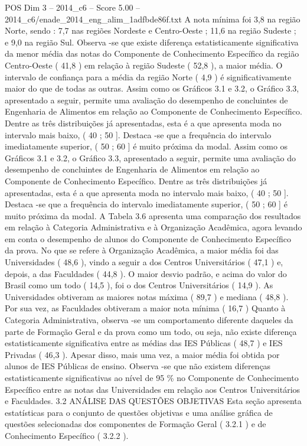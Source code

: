 \begin{textsample}{POS Dim 3 – 2014\_c6 – Score 5.00 – 2014\_c6/enade\_2014\_eng\_alim\_1adfbde86f.txt}
A nota mínima foi 3,8 na região Norte, sendo : 7,7 nas regiões Nordeste e Centro-Oeste ; 11,6 na região Sudeste ; e 9,0 na região Sul.
Observa -se que existe diferença estatisticamente significativa da menor média das notas do Componente de Conhecimento Específico da região Centro-Oeste ( 41,8 ) em relação à região Sudeste ( 52,8 ), a maior média.
O intervalo de confiança para a média da região Norte ( 4,9 ) é significativamente maior do que de todas as outras.
Assim como os Gráficos 3.1 e 3.2, o Gráfico 3.3, apresentado a seguir, permite uma avaliação do desempenho de concluintes de Engenharia de Alimentos em relação ao Componente de Conhecimento Específico.
Dentre as três distribuições já apresentadas, esta é a que apresenta moda no intervalo mais baixo, ( 40 ; 50 ].
Destaca -se que a frequência do intervalo imediatamente superior, ( 50 ; 60 ] é muito próxima da modal.
Assim como os Gráficos 3.1 e 3.2, o Gráfico 3.3, apresentado a seguir, permite uma avaliação do desempenho de concluintes de Engenharia de Alimentos em relação ao Componente de Conhecimento Específico.
Dentre as três distribuições já apresentadas, esta é a que apresenta moda no intervalo mais baixo, ( 40 ; 50 ].
Destaca -se que a frequência do intervalo imediatamente superior, ( 50 ; 60 ] é muito próxima da modal.
A Tabela 3.6 apresenta uma comparação dos resultados em relação à Categoria Administrativa e à Organização Acadêmica, agora levando em conta o desempenho de alunos do Componente de Conhecimento Específico da prova.
No que se refere à Organização Acadêmica, a maior média foi das Universidades ( 48,6 ), vindo a seguir a dos Centros Universitários ( 47,1 ) e, depois, a das Faculdades ( 44,8 ).
O maior desvio padrão, e acima do valor do Brasil como um todo ( 14,5 ), foi o dos Centros Universitários ( 14,9 ).
As Universidades obtiveram as maiores notas máxima ( 89,7 ) e mediana ( 48,8 ).
Por sua vez, as Faculdades obtiveram a maior nota mínima ( 16,7 ) Quanto à Categoria Administrativa, observa -se um comportamento diferente daqueles da parte de Formação Geral e da prova como um todo, ou seja, não existe diferença estatisticamente significativa entre as médias das IES Públicas ( 48,7 ) e IES Privadas ( 46,3 ).
Apesar disso, mais uma vez, a maior média foi obtida por alunos de IES Públicas de ensino.
Observa -se que não existem diferenças estatisticamente significativas ao nível de 95 \% no Componente de Conhecimento Específico entre as notas das Universidades em relação aos Centros Universitários e Faculdades. 3.2 ANÁLISE DAS QUESTÕES OBJETIVAS Esta seção apresenta estatísticas para o conjunto de questões objetivas e uma análise gráfica de questões selecionadas dos componentes de Formação Geral ( 3.2.1 ) e de Conhecimento Específico ( 3.2.2 ).

\end{textsample}
